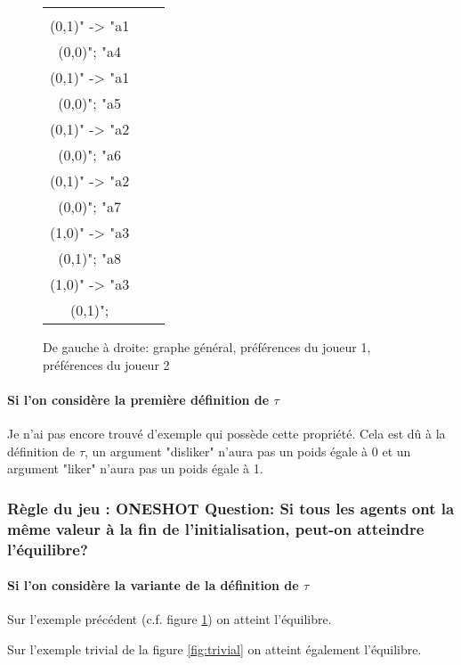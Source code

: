 \documentclass[12pt]{article}
\theoremstyle{defi}
\theoremstyle{not}
\theoremstyle{prob}
\begin{document}
\begin{figure}
\begin{tabular}{ccc}
\begin{tikzpicture}[>=stealth]
{  "a3\\ (0,1)" -> "a1\\ (0,0)";
  "a4\\ (0,1)" -> "a1\\ (0,0)";
  "a5\\ (0,1)" -> "a2\\ (0,0)";
  "a6\\ (0,1)" -> "a2\\ (0,0)";
  "a7\\ (1,0)" -> "a3\\ (0,1)";
  "a8\\ (1,0)" -> "a3\\ (0,1)";
  };
  \end{tikzpicture} \\
\end{tabular}

\caption{De gauche à droite: graphe général, préférences du joueur 1, préférences du joueur 2}
\label{fig:dif_pref}
\end{figure}

\paragraph{Si l'on considère la première définition de $\tau$\\}
Je n'ai pas encore trouvé d'exemple qui possède cette propriété.
Cela est dû à la définition de $\tau$, un argument "disliker" n'aura pas un poids égale à 0 et un argument "liker" n'aura pas un poids égale à 1.


\subsubsection{Règle du jeu : ONESHOT Question: Si tous les agents ont la même valeur à la fin de l'initialisation, peut-on atteindre l'équilibre?}

\paragraph{Si l'on considère la variante de la définition de $\tau$\\}

Sur l'exemple précédent (c.f. figure \ref{fig:dif_pref}) on atteint l'équilibre.

Sur l'exemple trivial de la figure \ref{fig:trivial} on atteint également l'équilibre.
\end{document}
